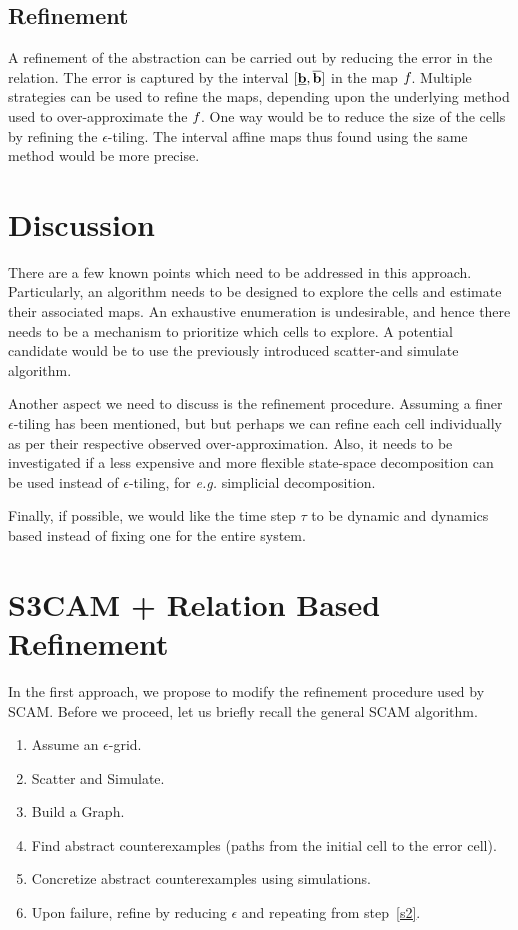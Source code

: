\subsection{Refinement} A refinement of the abstraction can be carried
out by reducing the error in the relation. The error is captured by
the interval $[\underline{\mathbf{b}}, \overline{\mathbf{b}}]$ in the map $f_{}$.
Multiple strategies can be used to refine the maps, depending upon the
underlying method used to over-approximate the $f_{}$. One way would
be to reduce the size of the cells by refining the $\epsilon$-tiling.
The interval affine maps thus found using the same method would be
more precise.

\section{Discussion}

There are a few known points which need to be addressed in this
approach. Particularly, an algorithm needs to be designed to explore
the cells and estimate their associated maps. An exhaustive
enumeration is undesirable, and hence there needs to be a mechanism to
prioritize which cells to explore. A potential candidate would be to
use the previously introduced scatter-and simulate algorithm.

Another aspect we need to discuss is the refinement procedure.
Assuming a finer $\epsilon$-tiling has been mentioned, but but perhaps
we can refine each cell individually as per their respective observed
over-approximation. Also, it needs to be investigated if a less
expensive and more flexible state-space decomposition can be used
instead of $\epsilon$-tiling, for \emph{e.g.} simplicial
decomposition.

Finally, if possible, we would like the time step $\tau$ to be dynamic
and dynamics based instead of fixing one for the entire system.


\section{S3CAM + Relation Based Refinement}
In the first approach, we propose to modify the refinement procedure
used by SCAM. Before we proceed, let us briefly recall the general
SCAM algorithm.

\begin{enumerate}
    \item Assume an $\epsilon$-grid.
    \item Scatter and Simulate.\label{s2}
    \item Build a Graph.
    \item Find abstract counterexamples (paths from the initial cell
        to the error cell).
    \item Concretize abstract counterexamples using simulations.
    \item Upon failure, refine by reducing $\epsilon$ and
        repeating from step~\ref{s2}.
\end{enumerate}

